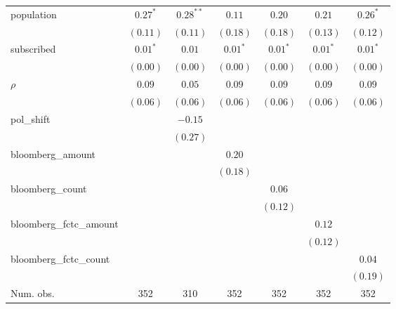 \begin{table}[!h]
\begin{center}
\begin{tabular}{l c c c c c c }
population              & $0.27^{*}$   & $0.28^{**}$  & $0.11$       & $0.20$       & $0.21$       & $0.26^{*}$   \\
                        & $(0.11)$     & $(0.11)$     & $(0.18)$     & $(0.18)$     & $(0.13)$     & $(0.12)$     \\
subscribed              & $0.01^{*}$   & $0.01$       & $0.01^{*}$   & $0.01^{*}$   & $0.01^{*}$   & $0.01^{*}$   \\
                        & $(0.00)$     & $(0.00)$     & $(0.00)$     & $(0.00)$     & $(0.00)$     & $(0.00)$     \\
$\rho$                  & $0.09$       & $0.05$       & $0.09$       & $0.09$       & $0.09$       & $0.09$       \\
                        & $(0.06)$     & $(0.06)$     & $(0.06)$     & $(0.06)$     & $(0.06)$     & $(0.06)$     \\
pol\_shift              &              & $-0.15$      &              &              &              &              \\
                        &              & $(0.27)$     &              &              &              &              \\
bloomberg\_amount       &              &              & $0.20$       &              &              &              \\
                        &              &              & $(0.18)$     &              &              &              \\
bloomberg\_count        &              &              &              & $0.06$       &              &              \\
                        &              &              &              & $(0.12)$     &              &              \\
bloomberg\_fctc\_amount &              &              &              &              & $0.12$       &              \\
                        &              &              &              &              & $(0.12)$     &              \\
bloomberg\_fctc\_count  &              &              &              &              &              & $0.04$       \\
                        &              &              &              &              &              & $(0.19)$     \\
\midrule
Num. obs.               & 352          & 310          & 352          & 352          & 352          & 352          \\

\end{tabular}
\end{center}
\end{table}
